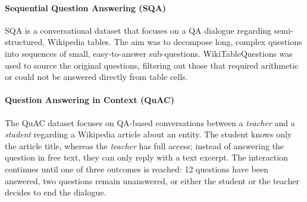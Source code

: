 \documentclass[11pt]{article}
\begin{document}

\paragraph{Sequential Question Answering (SQA)}
SQA \cite{iyyer_searchbased_2017} is a conversational dataset that focuses on a QA dialogue regarding semi-structured, Wikipedia tables. The aim was to decompose long, complex questions into sequences of small, easy-to-answer sub-questions. WikiTableQuestions \cite{ho_constructing_2020} was used to source the original questions, filtering out those that required arithmetic or could not be answered directly from table cells.   

\paragraph{Question Answering in Context (QuAC)}
The QuAC \cite{choi_quac_2018} dataset focuses on QA-based conversations between a \textit{teacher} and a \textit{student} regarding a Wikipedia article about an entity. The student knows only the article title, whereas the \textit{teacher} has full access; instead of answering the question in free text, they can only reply with a text excerpt. The interaction continues until one of three outcomes is reached: 12 questions have been answered, two questions remain unanswered, or either the student or the teacher decides to end the dialogue.
\end{document}
